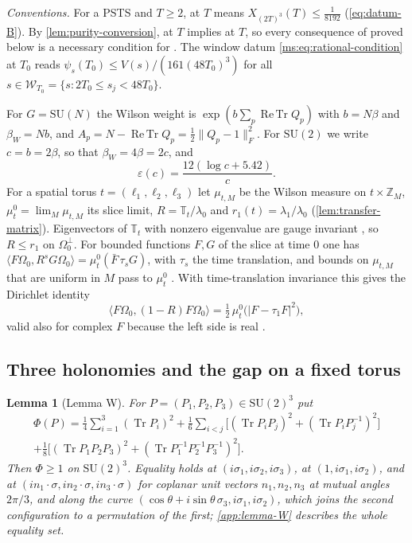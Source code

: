 \documentclass[11pt,a4paper]{amsart}
\newtheorem{lemma}[theorem]{Lemma}
\theoremstyle{definition}
\theoremstyle{remark}
\numberwithin{equation}{section}
\DeclareMathOperator{\Tr}{Tr}        %
\DeclareMathOperator{\ReTr}{Re\,Tr}  %
\newcommand{\Z}{\mathbb{Z}}          %
\newcommand{\Wwin}{\mathcal{W}}      %
\newcommand{\ip}[2]{\langle #1,#2\rangle}  %
\newcommand{\norm}[1]{\lVert #1\rVert}     %
\newcommand{\abs}[1]{\lvert #1\rvert}      %
\newcommand{\SU}{\mathrm{SU}}              %
\newcommand{\PSTS}{\textup{PSTS}}          %
\newcommand{\TT}{\mathbb{T}}               %
\newcommand{\Zc}{\mathcal{Z}}              %
\newcommand{\XT}[2]{X_{#1}(#2)}            %
\newcommand{\psiT}[2]{\psi_{#1}(#2)}       %
\newcommand{\Vol}[1]{V(#1)}                %
\newcommand{\cube}[1]{(2#1)^3}             %
\newcommand{\lzero}{\lambda_0}             %
\newcommand{\Omegazero}{\Omega_0}          %
\newcommand{\xconst}{\frac{1}{8192}}       %
\newcommand{\Mcirc}{\text{\upshape(M$^{\circ}$)}}   %
\newcommand{\Bcirc}{\text{\upshape(B$^{\circ}$)}}   %
\newcommand{\betaW}{\beta_{W}}             %
\begin{document}
\medskip\noindent\textit{Conventions.} For a \PSTS{} and $T\ge2$, \Bcirc{} at $T$ means $\XT{\cube{T}}{T}\le\xconst$ (\cref{eq:datum-B}). By \cref{lem:purity-conversion}, \Mcirc{} at $T$ implies \Bcirc{} at $T$, so every consequence of \Bcirc{} proved below is a necessary condition for \Mcirc. The window datum \cref{ms:eq:rational-condition} at $T_0$ reads $\psiT{s}{T_0}\le\Vol{s}/(161(48T_0)^3)$ for all $s\in\Wwin_{T_0}=\{s:2T_0\le s_j<48T_0\}$.

For $G=\SU(N)$ the Wilson weight is $\exp(b\sum_p\ReTr Q_p)$ with $b=N\beta$ and $\betaW=Nb$, and $A_p=N-\ReTr Q_p=\frac12\norm{Q_p-1}_F^2$. For $\SU(2)$ we write $c=b=2\beta$, so that $\betaW=4\beta=2c$, and
\[
\varepsilon(c)=\frac{12(\log c+5.42)}{c}.
\]
For a spatial torus $t=(\ell_1,\ell_2,\ell_3)$ let $\mu_{t,M}$ be the Wilson measure on $t\times\Z_M$, $\mu^0_t=\lim_M\mu_{t,M}$ its slice limit, $R=\TT_t/\lzero$ and $r_1(t)=\lambda_1/\lzero$ (\cref{lem:transfer-matrix}). Eigenvectors of $\TT_t$ with nonzero eigenvalue are gauge invariant \cite[Lemma~11(i)]{bhattacharjee2026first}, so $R\le r_1$ on $\Omegazero^\perp$. For bounded functions $F,G$ of the slice at time $0$ one has $\ip{F\Omegazero}{R^sG\Omegazero}=\mu^0_t(\bar F\,\tau_sG)$, with $\tau_s$ the time translation, and bounds on $\mu_{t,M}$ that are uniform in $M$ pass to $\mu^0_t$ \cite[Lemma~11(v)]{bhattacharjee2026first}. With time-translation invariance this gives the Dirichlet identity
\[
\ip{F\Omegazero}{(1-R)F\Omegazero}=\tfrac12\,\mu^0_t\bigl(\abs{F-\tau_1F}^2\bigr),
\]
valid also for complex $F$ because the left side is real \cite[Theorem~8, Step~4]{bhattacharjee2026first}.

\subsection{Three holonomies and the gap on a fixed torus}

\begin{lemma}[Lemma W]\label{lem:lemma-W}
For $P=(P_1,P_2,P_3)\in\SU(2)^3$ put
\begin{multline*}
\Phi(P)=\frac14\sum_{i=1}^3(\Tr P_i)^2+\frac16\sum_{i<j}\bigl[(\Tr P_iP_j)^2+(\Tr P_iP_j^{-1})^2\bigr]\\
+\frac18\bigl[(\Tr P_1P_2P_3)^2+(\Tr P_1^{-1}P_2^{-1}P_3^{-1})^2\bigr].
\end{multline*}
Then $\Phi\ge1$ on $\SU(2)^3$. Equality holds at $(i\sigma_1,i\sigma_2,i\sigma_3)$, at $(1,i\sigma_1,i\sigma_2)$, and at $(in_1\cdot\sigma,in_2\cdot\sigma,in_3\cdot\sigma)$ for coplanar unit vectors $n_1,n_2,n_3$ at mutual angles $2\pi/3$, and along the curve $(\cos\theta+i\sin\theta\,\sigma_3,i\sigma_1,i\sigma_2)$, which joins the second configuration to a permutation of the first; \cref{app:lemma-W} describes the whole equality set.
\end{lemma}
\end{document}
